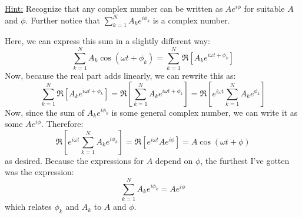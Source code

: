 \documentclass[10pt]{article}
\begin{document}
\begin{enumerate}[label=\alph*)]
			\underline{Hint:} Recognize that any complex number can be written as \( Ae^{i \phi} \) for suitable 
			\( A \) and \( \phi \). Further notice that \( \sum_{k = 1}^{N}A_k e^{i \phi_k} \) is a complex 
			number. 

			\begin{solution}
				Here, we can express this sum in a slightly different way:
				\[
					\sum_{k = 1}^{N}A_k \cos(\omega t + \phi_k) =  \sum_{k = 1}^{N}\Re\left[A_k e^{i \omega t + \phi_k} \right]
				\] 
				Now, because the real part adds linearly, we can rewrite this as:
				\[
				\sum_{k = 1}^{N}\Re\left[ A_k e^{i \omega t + \phi_k} \right]  = \Re\left[ \sum_{k = 1}^{N}
				A_k e^{i \omega t + \phi_k}\right]  = \Re\left[ e^{i \omega t} \sum_{k = 1}^{N}A_k e^{\phi_k} \right] 
				\] 
				Now, since the sum of  \( A_k e^{i \phi_k} \) is some general complex number, we can write it as some 
				\( A e^{i \phi} \). Therefore:
				\[
				\Re\left[ e^{i \omega t}\sum_{k = 1}^{N}A_k e^{i \phi_k} \right]  = \Re\left[ e^{i \omega t} 
				Ae^{i \phi} \right] = A\cos(\omega t + \phi)
				\] 
				as desired. Because the expressions for \( A \) depend on \( \phi \), the furthest I've gotten 
				was the expression:
				\[
				\sum_{k = 1}^{N}A_k e^{i \phi_k} = Ae^{i \phi}
				\] 
				which relates \( \phi_k \) and \( A_k \) to \( A \) and \( \phi \). 
			\end{solution}
	\end{enumerate}
	\pagebreak
\end{document}
